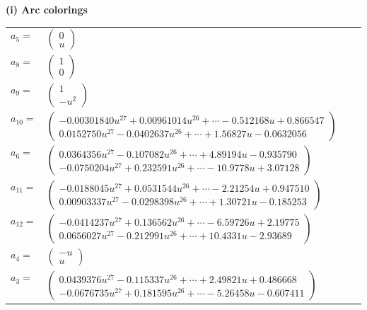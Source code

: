 \documentclass[1p]{elsarticle_modified}
\theoremstyle{definition}
\begin{document}
\flushleft \textbf{(i) Arc colorings}\\
\begin{tabular}{m{7pt} m{180pt} m{7pt} m{180pt} }
\flushright $a_{5}=$&$\begin{pmatrix}0\\u\end{pmatrix}$ \\
\flushright $a_{8}=$&$\begin{pmatrix}1\\0\end{pmatrix}$ \\
\flushright $a_{9}=$&$\begin{pmatrix}1\\- u^2\end{pmatrix}$ \\
\flushright $a_{10}=$&$\begin{pmatrix}-0.00301840 u^{27}+0.00961014 u^{26}+\cdots-0.512168 u+0.866547\\0.0152750 u^{27}-0.0402637 u^{26}+\cdots+1.56827 u-0.0632056\end{pmatrix}$ \\
\flushright $a_{6}=$&$\begin{pmatrix}0.0364356 u^{27}-0.107082 u^{26}+\cdots+4.89194 u-0.935790\\-0.0750204 u^{27}+0.232591 u^{26}+\cdots-10.9778 u+3.07128\end{pmatrix}$ \\
\flushright $a_{11}=$&$\begin{pmatrix}-0.0188045 u^{27}+0.0531544 u^{26}+\cdots-2.21254 u+0.947510\\0.00903337 u^{27}-0.0298398 u^{26}+\cdots+1.30721 u-0.185253\end{pmatrix}$ \\
\flushright $a_{12}=$&$\begin{pmatrix}-0.0414237 u^{27}+0.136562 u^{26}+\cdots-6.59726 u+2.19775\\0.0656027 u^{27}-0.212991 u^{26}+\cdots+10.4331 u-2.93689\end{pmatrix}$ \\
\flushright $a_{4}=$&$\begin{pmatrix}- u\\u\end{pmatrix}$ \\
\flushright $a_{3}=$&$\begin{pmatrix}0.0439376 u^{27}-0.115337 u^{26}+\cdots+2.49821 u+0.486668\\-0.0676735 u^{27}+0.181595 u^{26}+\cdots-5.26458 u-0.607411\end{pmatrix}$ \\

\end{tabular}
\end{document}
